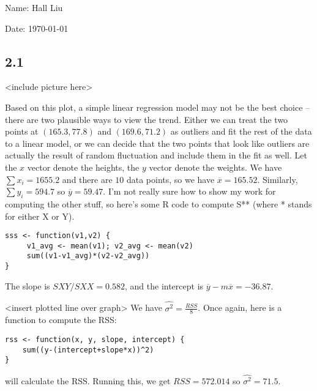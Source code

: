 \documentclass{article}
\newcommand{\conj}{\overline}
\begin{document}
Name: Hall Liu

Date: \today 
\vspace{1.5cm}

\subsection*{2.1}
<include picture here>

Based on this plot, a simple linear regression model may not be the best choice -- there are two plausible ways to view the trend. Either we can treat the two points at $(165.3,77.8)$ and $(169.6,71.2)$ as outliers and fit the rest of the data to a linear model, or we can decide that the two points that look like outliers are actually the result of random fluctuation and include them in the fit as well.
Let the $x$ vector denote the heights, the $y$ vector denote the weights. We have $\sum x_i=1655.2$ and there are $10$ data points, so we have $\conj{x}=165.52$. Similarly, $\sum y_i=594.7$ so $\conj{y}=59.47$. I'm not really sure how to show my work for computing the other stuff, so here's some R code to compute S** (where * stands for either X or Y).
\begin{verbatim}
sss <- function(v1,v2) {
     v1_avg <- mean(v1); v2_avg <- mean(v2)
     sum((v1-v1_avg)*(v2-v2_avg))
}
\end{verbatim}

The slope is $SXY/SXX=0.582$, and the intercept is $\conj{y}-m\conj{x}=-36.87$. 

<insert plotted line over graph>
We have $\widehat{\sigma^2}=\frac{RSS}{8}$. Once again, here is a function to compute the RSS:
\begin{verbatim}
rss <- function(x, y, slope, intercept) {
    sum((y-(intercept+slope*x))^2)
}
\end{verbatim}
will calculate the RSS. Running this, we get $RSS=572.014$ so $\widehat{\sigma^2}=71.5$.
\end{document}

